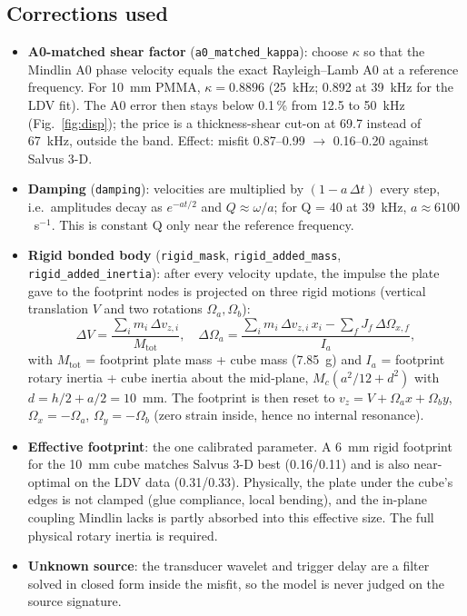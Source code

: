 \documentclass[11pt,a4paper]{article}
\newcommand{\code}[1]{\texttt{\footnotesize #1}}
\begin{document}
\subsection{Corrections used}
\begin{itemize}
  \item \textbf{A0-matched shear factor} (\code{a0\_matched\_kappa}): choose $\kappa$ so that the Mindlin A0 phase
        velocity equals the exact Rayleigh--Lamb A0 at a reference frequency. For 10~mm PMMA,
        $\kappa = 0.8896$ (25~kHz; 0.892 at 39~kHz for the LDV fit). The A0 error then stays below 0.1\,\% from 12.5 to
        50~kHz (Fig.~\ref{fig:disp}); the price is a thickness-shear cut-on at 69.7 instead of 67~kHz, outside the band.
        Effect: misfit 0.87--0.99 $\to$ 0.16--0.20 against Salvus 3-D.
  \item \textbf{Damping} (\code{damping}): velocities are multiplied by $(1 - a\,\Delta t)$ every step, i.e.\ amplitudes
        decay as $e^{-a t/2}$ and $Q \approx \omega/a$; for Q = 40 at 39~kHz, $a \approx 6100$~s$^{-1}$. This is
        constant Q only near the reference frequency.
  \item \textbf{Rigid bonded body} (\code{rigid\_mask}, \code{rigid\_added\_mass}, \code{rigid\_added\_inertia}): after every
        velocity update, the impulse the plate gave to the footprint nodes is projected on three rigid motions
        (vertical translation $V$ and two rotations $\Omega_a, \Omega_b$):
        \[
        \Delta V = \frac{\sum_i m_i\,\Delta v_{z,i}}{M_\text{tot}}, \quad
        \Delta\Omega_a = \frac{\sum_i m_i\,\Delta v_{z,i}\,x_i - \sum_f J_f\,\Delta\Omega_{x,f}}{I_a},
        \]
        with $M_\text{tot}$ = footprint plate mass + cube mass (7.85~g) and $I_a$ = footprint rotary inertia + cube
        inertia about the mid-plane, $M_c(a^2/12 + d^2)$ with $d = h/2 + a/2 = 10$~mm. The footprint is then reset to
        $v_z = V + \Omega_a x + \Omega_b y$, $\Omega_x = -\Omega_a$, $\Omega_y = -\Omega_b$ (zero strain inside, hence
        no internal resonance).
  \item \textbf{Effective footprint}: the one calibrated parameter. A 6~mm rigid footprint for the 10~mm cube matches
        Salvus 3-D best (0.16/0.11) and is also near-optimal on the LDV data (0.31/0.33). Physically, the plate under the
        cube's edges is not clamped (glue compliance, local bending), and the in-plane coupling Mindlin lacks is partly
        absorbed into this effective size. The full physical rotary inertia is required.
  \item \textbf{Unknown source}: the transducer wavelet and trigger delay are a filter solved in closed form inside the
        misfit, so the model is never judged on the source signature.
\end{itemize}
\end{document}
